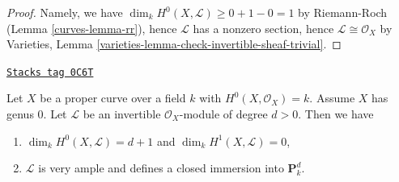 \begin{proof}

Namely, we have $\dim_k H^0(X, \mathcal{L}) \geq 0 + 1 - 0 = 1$
by Riemann-Roch (Lemma \ref{curves-lemma-rr}), hence $\mathcal{L}$ has a
nonzero section, hence $\mathcal{L} \cong \mathcal{O}_X$ by
Varieties, Lemma \ref{varieties-lemma-check-invertible-sheaf-trivial}.
\end{proof}

\begin{lemma}
\label{curves-lemma-genus-zero-positive-degree}
\href{https://stacks.math.columbia.edu/tag/0C6T}{\texttt{Stacks tag 0C6T}}

Let $X$ be a proper curve over a field $k$ with $H^0(X, \mathcal{O}_X) = k$.
Assume $X$ has genus $0$. Let $\mathcal{L}$ be an invertible
$\mathcal{O}_X$-module of degree $d > 0$. Then we have
\begin{enumerate}
\item $\dim_k H^0(X, \mathcal{L}) = d + 1$ and $\dim_k H^1(X, \mathcal{L}) = 0$,
\item $\mathcal{L}$ is very ample and defines a closed immersion into
$\mathbf{P}^d_k$.
\end{enumerate}
\end{lemma}

